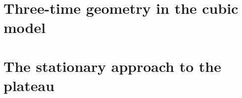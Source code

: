 \documentclass[12pt,oneside,openany]{book}
\numberwithin{equation}{chapter}
\theoremstyle{plain}
\theoremstyle{definition}
\theoremstyle{remark}
\newcommand{\1}{\mathbf 1}
\begin{document}
\part{Three-time geometry in the cubic model}\label{part:geometry}




\part{The stationary approach to the plateau}\label{part:relaxation}



\backmatter


\end{document}
